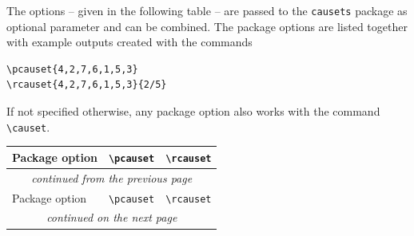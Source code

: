 \documentclass[12pt]{article}
\begin{document}
The options -- given in the following table -- are passed to the \lstinline&causets& package as optional parameter and can be combined.
The package options are listed together with example outputs created with the commands
\begin{lstlisting}
\pcauset{4,2,7,6,1,5,3}
\rcauset{4,2,7,6,1,5,3}{2/5}
\end{lstlisting}
If not specified otherwise, any package option also works with the command \lstinline&\causet&.

\begin{longtable}{p{}p{}p{}}
  \toprule
  Package option & \lstinline+\pcauset+ & \lstinline+\rcauset+
  \\\midrule
  \endfirsthead

  \multicolumn{3}{c}{\footnotesize \textit{continued from the previous page}}
  \\\midrule
  Package option & \lstinline+\pcauset+ & \lstinline+\rcauset+
  \\\midrule
  \endhead

  \midrule
  \multicolumn{3}{c}{\footnotesize \textit{continued on the next page}}
  \endfoot

  \endlastfoot


\end{longtable}
\end{document}
